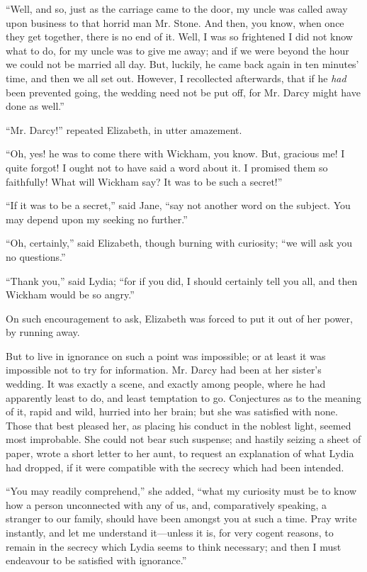 \documentclass[12pt]{book}
\begin{document}
``Well, and so, just as the carriage came to the door, my uncle was called away upon business to that horrid man Mr. Stone. And then, you know, when once they get together, there is no end of it. Well, I was so frightened I did not know what to do, for my uncle was to give me away; and if we were beyond the hour we could not be married all day. But, luckily, he came back again in ten minutes' time, and then we all set out. However, I recollected afterwards, that if he \textit{had} been prevented going, the wedding need not be put off, for Mr. Darcy might have done as well.''

``Mr. Darcy!'' repeated Elizabeth, in utter amazement.

``Oh, yes! he was to come there with Wickham, you know. But, gracious me! I quite forgot! I ought not to have said a word about it. I promised them so faithfully! What will Wickham say? It was to be such a secret!''

``If it was to be a secret,'' said Jane, ``say not another word on the subject. You may depend upon my seeking no further.''

``Oh, certainly,'' said Elizabeth, though burning with curiosity; ``we will ask you no questions.''

``Thank you,'' said Lydia; ``for if you did, I should certainly tell you all, and then Wickham would be so angry.''

On such encouragement to ask, Elizabeth was forced to put it out of her power, by running away.

But to live in ignorance on such a point was impossible; or at least it was impossible not to try for information. Mr. Darcy had been at her sister's wedding. It was exactly a scene, and exactly among people, where he had apparently least to do, and least temptation to go. Conjectures as to the meaning of it, rapid and wild, hurried into her brain; but she was satisfied with none. Those that best pleased her, as placing his conduct in the noblest light, seemed most improbable. She could not bear such suspense; and hastily seizing a sheet of paper, wrote a short letter to her aunt, to request an explanation of what Lydia had dropped, if it were compatible with the secrecy which had been intended.

``You may readily comprehend,'' she added, ``what my curiosity must be to know how a person unconnected with any of us, and, comparatively speaking, a stranger to our family, should have been amongst you at such a time. Pray write instantly, and let me understand it---unless it is, for very cogent reasons, to remain in the secrecy which Lydia seems to think necessary; and then I must endeavour to be satisfied with ignorance.''
\end{document}
